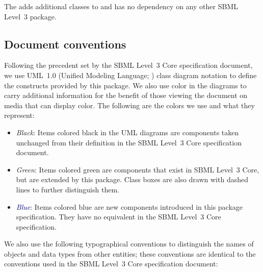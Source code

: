 The \FBCPackage adds additional classes to \sbmlthreecore and has no
dependency on any other SBML Level~3 package.


\subsection{Document conventions} \label{conventions}

Following the precedent set by the SBML Level~3 Core specification
document, we use UML~1.0 (Unified Modeling Language;
\citealt{eriksson:1998,oestereich:1999}) class diagram notation to
define the constructs provided by this package. We also use color in the
diagrams to carry additional information for the benefit of those
viewing the document on media that can display color. The following are
the colors we use and what they represent:

\begin{itemize}

\item[\raisebox{2.75pt}{\colorbox{black}{\rule{0.8pt}{0.8pt}}}]
\emph{Black}: Items colored black in the UML diagrams are components
taken unchanged from their definition in the SBML Level~3 Core
specification document.

\item[\raisebox{2.75pt}{\colorbox{mediumgreen}{\rule{0.8pt}{0.8pt}}}]
\emph{\textcolor{mediumgreen}{Green}}: Items colored green are
components that exist in SBML Level~3 Core, but are extended by this
package. Class boxes are also drawn with dashed lines to further
distinguish them.

\item[\raisebox{2.75pt}{\colorbox{darkblue}{\rule{0.8pt}{0.8pt}}}]
\emph{\textcolor{darkblue}{Blue}}: Items colored blue are new components
introduced in this package specification. They have no equivalent in the
SBML Level~3 Core specification.


\end{itemize}

We also use the following typographical conventions to distinguish the
names of objects and data types from other entities; these conventions
are identical to the conventions used in the SBML Level~3 Core
specification document:


